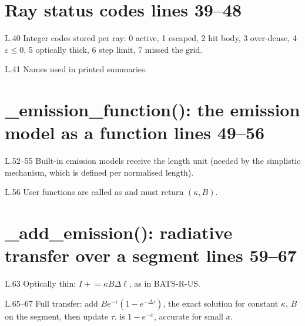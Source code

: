 \section*{\normalsize Ray status codes \hfill{\small\mdseries\color{gray}lines 39--48}}

\begin{lines}
\item[L.40] Integer codes stored per ray: 0 active, 1 escaped, 2 hit body, 3 over-dense, 4 $\varepsilon\le0$, 5 optically thick, 6 step limit, 7 missed the grid.
\item[L.41] Names used in printed summaries.
\end{lines}
\section*{\normalsize \_emission\_function(): the emission model as a function \hfill{\small\mdseries\color{gray}lines 49--56}}

\begin{lines}
\item[L.52–55] Built-in emission models receive the length unit (needed by the simplistic mechanism, which is defined per normalised length).
\item[L.56] User functions are called as  and must return $(\kappa, B)$.
\end{lines}
\section*{\normalsize \_add\_emission(): radiative transfer over a segment \hfill{\small\mdseries\color{gray}lines 59--67}}

\begin{lines}
\item[L.63] Optically thin: $I\mathrel{+}=\kappa B\Delta\ell$, as in BATS-R-US.
\item[L.65–67] Full transfer: add $B e^{-\tau}(1-e^{-\Delta\tau})$, the exact solution for constant $\kappa$, $B$ on the segment, then update $\tau$.  is $1-e^{-x}$, accurate for small $x$.
\end{lines}
